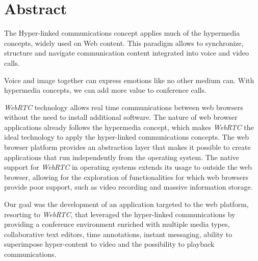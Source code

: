 \chapter*{Abstract}


The Hyper-linked communications concept applies much of the hypermedia concepts, widely used on Web content. This paradigm allows to synchronize, structure and navigate communication content integrated into voice and video calls.

Voice and image together can express emotions like no other medium can. With hypermedia concepts, we can add more value to conference calls.

\emph{WebRTC} technology allows real time communications between web browsers without the need to install additional software. The nature of web browser applications already follows the hypermedia concept, which makes \emph{WebRTC} the ideal technology to apply the hyper-linked communications concepts.
The web browser platform provides an abstraction layer that makes it possible to create applications that run independently from the operating system.
The native support for \emph{WebRTC} in operating systems extends its usage to outside the web browser, allowing for the exploration of functionalities for which web browsers provide poor support, such as video recording and massive information storage.



Our goal was the development of an application targeted to the web platform, resorting to \emph{WebRTC}, that leveraged the hyper-linked communications by providing a conference environment enriched with multiple media types, collaborative text editors, time annotations, instant messaging, ability to superimpose hyper-content to video and the possibility to playback communications.


